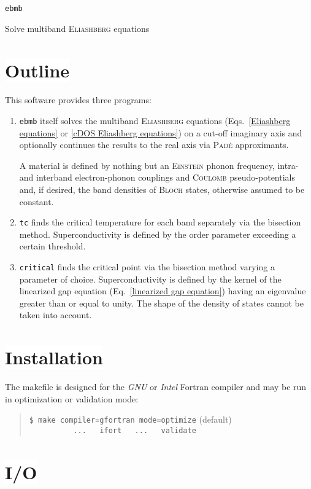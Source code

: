 \documentclass[a4paper]{article}
\newlength\gap
\def\headline#1{\section*{%
   \normalsize\normalfont%
   \rlap{\rule[0.5ex]\textwidth{0.4pt}}%
   \qquad\colorbox{white}{#1}%
   }}
\begin{document}
   \begin{center}
      \LARGE \texttt{ebmb} \par \bigskip
      \large Solve multiband \textsc{Eliashberg} equations
   \end{center}

   \headline{Outline}

   This software provides three programs:
   \begin{enumerate}
      \item
         \texttt{ebmb} itself solves the multiband \textsc{Eliashberg} equations
         (Eqs.~\ref{Eliashberg equations} or \ref{cDOS Eliashberg equations}) on
         a cut-off imaginary axis and optionally continues the results to the
         real axis via \textsc{Padé} approximants.

         A material is defined by nothing but an \textsc{Einstein} phonon
         frequency, intra- and interband electron-phonon couplings and
         \textsc{Coulomb} pseudo-potentials and, if desired, the band densities
         of \textsc{Bloch} states, otherwise assumed to be constant.

      \item
         \texttt{tc} finds the critical temperature for each band separately via
         the bisection method. Superconductivity is defined by the order
         parameter exceeding a certain threshold.

      \item
         \texttt{critical} finds the critical point via the bisection method
         varying a parameter of choice. Superconductivity is defined by the
         kernel of the linearized gap equation (Eq.~\ref{linearized gap
         equation}) having an eigenvalue greater than or equal to unity. The
         shape of the density of states cannot be taken into account.
   \end{enumerate}

   \headline{Installation}

   The makefile is designed for the \emph{GNU} or \emph{Intel} Fortran compiler
   and may be run in optimization or validation mode:
   \begin{quote}
      \verb|$ make compiler=gfortran mode=optimize| \quad (default) \\
      \verb|          ...   ifort   ...   validate|
   \end{quote}

   \headline{I/O}
\end{document}
